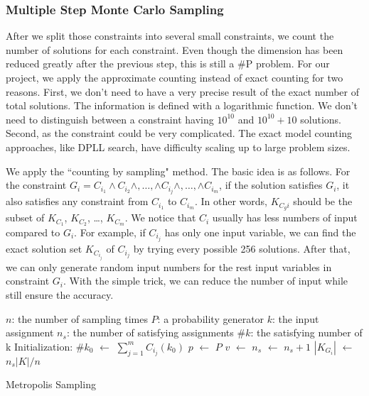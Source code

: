 \subsubsection{Multiple Step Monte Carlo Sampling}

After we split those constraints into several small constraints, we count
the number of solutions for each constraint. Even though the dimension
has been reduced greatly after the previous step, this is still a
\#P problem. For our project, we apply the approximate counting instead of
exact counting for two reasons. First, we don't need to have a very precise
result of the exact number of total solutions. The information is defined with
a logarithmic function. We don't need to distinguish between a constraint having
$10^{10}$ and $10^{10} + 10$ solutions.
Second, as the constraint could be very complicated. The exact model counting
approaches, like DPLL search, have difficulty scaling up to large problem sizes.

We apply the ``counting by sampling" method. The basic idea is as follows.
For the constraint $G_{i}= C_{i_1} \land C_{i_2} \land ,\ldots, \land C_{i_j} \land ,\ldots, 
\land C_{i_m}$, 
if the solution satisfies $G_{i}$, it also
satisfies any constraint from $C_{i_1}$ to $C_{i_m}$. In other words,
$K_{C_gi}$ should be the subset of $K_{C_1}$, $K_{C_2}$, \ldots , $K_{C_m}$.
We notice that $C_i$ usually has less numbers of input compared to $G_{i}$.
For example, if $C_{i_j}$ has only one input variable, we can find the exact
solution set $K_{C_{i_j}}$ of $C_{i_j}$ by trying every possible 256 solutions. After that,
we can only generate random input numbers for the rest input variables in 
constraint $G_{i}$. With the simple trick, we can reduce the number of input while
still ensure the accuracy.

\IncMargin{1em}
\begin{algorithm}
\SetAlgoLined
\DontPrintSemicolon


$n$: the number of sampling times \;
$P$: a probability generator \;
$k$: the input assignment \;
$n_{s}$: the number of satisfying assignments \;
$\#k$: the satisfying number of k  \; 
Initialization: \;
$\#{k_0}$ $\leftarrow$ $\sum_{j=1}^{m}C_{i_j}(k_0)$ \;
 {
      $p$ $\leftarrow$ $P$ \;
      {
        $v$ $\leftarrow$  {}
      }
      {$n_{s}$ $\leftarrow$ $n_{s} + 1$}
}
$|K_{G_{i}}|$ $\leftarrow$ $n_s|K| / n$
\caption{Metropolis Sampling}
\end{algorithm}
\DecMargin{1em}


